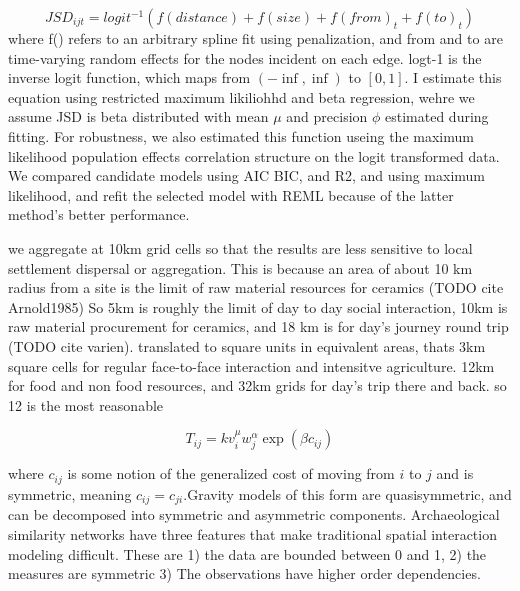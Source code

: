 \documentclass[11pt]{wlscirep}
\begin{document}
\begin{equation}
    JSD_{ijt} = logit^{-1}\left( f(distance) + f(size) + f(from)_t + f(to)_t\right)
\end{equation}
where f() refers to an arbitrary spline fit using penalization, and from and to are time-varying random effects for the nodes incident on each edge. logt-1 is the inverse logit function, which maps from $(-\inf, \inf)$ to $[0, 1]$. I estimate this equation using restricted maximum likiliohhd and beta regression, wehre we assume JSD is beta distributed with mean $\mu$ and precision $\phi$ estimated during fitting. For robustness, we also estimated this function useing the maximum likelihood population effects correlation structure on the logit transformed data. We compared candidate models using AIC BIC, and R2, and using maximum likelihood, and refit the selected model with REML because of the latter method's better performance.




 
 we aggregate at 10km grid cells so that the results are less sensitive to local settlement dispersal or aggregation.
 This is because an area of about 10 km radius from a site is the limit of raw material resources for ceramics (TODO cite Arnold1985)
 So 5km is roughly the limit of day to day social interaction, 10km is raw material procurement for ceramics, and 18 km is for day's journey round trip (TODO cite varien). translated to square units in equivalent areas, thats 3km square cells for regular face-to-face interaction and intensitve agriculture. 12km for food and non food resources, and 32km grids for day's trip there and back. so 12 is the most reasonable
 


\begin{equation}
T_{ij} = k v_i^\mu w_j^\alpha \exp(\beta c_{ij})
\end{equation}

where $c_{ij}$ is some notion of the generalized cost of moving from $i$ to $j$ and is symmetric, meaning $c_{ij} = c_{ji}$.Gravity models of this form are quasisymmetric, and can be decomposed into symmetric and asymmetric components. 
Archaeological similarity networks have three features that make traditional spatial interaction modeling difficult. These are 1) the data are bounded between 0 and 1, 2) the measures are symmetric
3) The observations have higher order dependencies.
\end{document}
